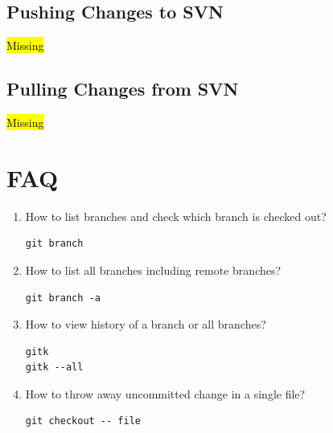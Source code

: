 \documentclass[a4paper,10pt]{article}
\begin{document}
\begin{itemize}
\subsection{Pushing Changes to SVN}
\hl{Missing}


\subsection{Pulling Changes from SVN}
\hl{Missing}




\end{itemize}



\section{FAQ}
\begin{enumerate}
  \item How to list branches and check which branch is checked out?
    \begin{lstlisting}
git branch
    \end{lstlisting}
  \item How to list all branches including remote branches?
    \begin{lstlisting}
git branch -a
    \end{lstlisting}
  \item How to view history of a branch or all branches?
    \begin{lstlisting}
gitk
gitk --all
    \end{lstlisting}
  \item How to throw away uncommitted change in a single file?
    \begin{lstlisting}
git checkout -- file
    \end{lstlisting}

\end{enumerate}
\end{document}
